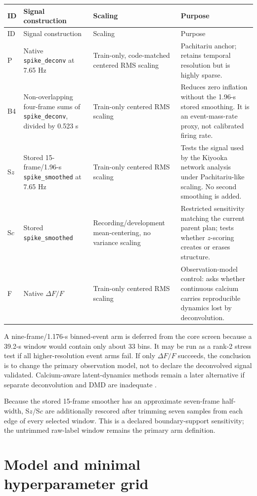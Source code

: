 \documentclass[11pt,a4paper]{article}
\begin{document}
\begin{longtable}{@{}P{0.12\textwidth}P{0.27\textwidth}P{0.23\textwidth}P{0.30\textwidth}@{}}
\toprule
ID & Signal construction & Scaling & Purpose\\
\midrule
\endfirsthead
\toprule
ID & Signal construction & Scaling & Purpose\\
\midrule
\endhead
P & Native \texttt{spike\_deconv} at 7.65 Hz & Train-only, code-matched
centered RMS scaling & Pachitariu anchor; retains temporal resolution but is
highly sparse.\\
B4 & Non-overlapping four-frame sums of \texttt{spike\_deconv}, divided by
0.523 s & Train-only centered RMS scaling & Reduces zero inflation without the
1.96-s stored smoothing. It is an event-mass-rate proxy, not calibrated firing rate.\\
S$z$ & Stored 15-frame/1.96-s \texttt{spike\_smoothed} at 7.65 Hz & Train-only
centered RMS scaling & Tests the signal used by the Kiyooka network analysis
under Pachitariu-like scaling. No second smoothing is added.\\
S$c$ & Stored \texttt{spike\_smoothed} & Recording/development mean-centering,
no variance scaling & Restricted sensitivity matching the current parent plan;
tests whether $z$-scoring creates or erases structure.\\
F & Native $\Delta F/F$ & Train-only centered RMS scaling & Observation-model
control: asks whether continuous calcium carries reproducible dynamics lost by
deconvolution.\\
\bottomrule
\end{longtable}

A nine-frame/1.176-s binned-event arm is deferred from the core screen because a
39.2-s window would contain only about 33 bins. It may be run as a rank-2 stress
test if all higher-resolution event arms fail. If only $\Delta F/F$ succeeds,
the conclusion is to change the primary observation model, not to declare the
deconvolved signal validated. Calcium-aware latent-dynamics methods remain a
later alternative if separate deconvolution and DMD are inadequate
\citep{wei2020,koh2023}.

Because the stored 15-frame smoother has an approximate seven-frame half-width,
S$z$/S$c$ are additionally rescored after trimming seven samples from each edge
of every selected window. This is a declared boundary-support sensitivity; the
untrimmed raw-label window remains the primary arm definition.

\section{Model and minimal hyperparameter grid}
\end{document}
